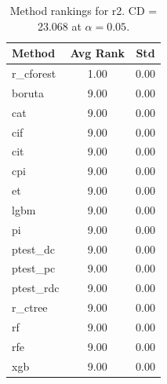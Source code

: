 \begin{table}[h]
\centering
\caption{Method rankings for r2. CD = 23.068 at $\alpha=0.05$.}
\label{tab:ranks_r2}
\begin{tabular}{lcc}
\toprule
Method & Avg Rank & Std \\
\midrule
r_cforest & 1.00 & 0.00 \\
boruta & 9.00 & 0.00 \\
cat & 9.00 & 0.00 \\
cif & 9.00 & 0.00 \\
cit & 9.00 & 0.00 \\
cpi & 9.00 & 0.00 \\
et & 9.00 & 0.00 \\
lgbm & 9.00 & 0.00 \\
pi & 9.00 & 0.00 \\
ptest_dc & 9.00 & 0.00 \\
ptest_pc & 9.00 & 0.00 \\
ptest_rdc & 9.00 & 0.00 \\
r_ctree & 9.00 & 0.00 \\
rf & 9.00 & 0.00 \\
rfe & 9.00 & 0.00 \\
xgb & 9.00 & 0.00 \\
\bottomrule
\end{tabular}
\end{table}